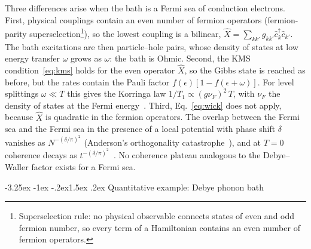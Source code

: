 \documentclass[10pt,a4paper]{article}
\makeatletter
\renewcommand{\subsection}{\@startsection{subsection}{2}{\z@}%
  {-3.25ex \@plus -1ex \@minus -.2ex}{1.5ex \@plus .2ex}%
  {\normalfont\fontsize{15.5pt}{19pt}\selectfont\bfseries}}
\makeatother
\begin{document}
Three differences arise when the bath is a Fermi sea of conduction electrons.
First, physical couplings contain an even number of fermion operators (fermion-parity superselection\footnote{Superselection rule: no physical observable connects states of even and odd fermion number, so every term of a Hamiltonian contains an even number of fermion operators.}), so the lowest coupling is a bilinear, $ \hat X = \sum_{kk'} g_{kk'} \hat c_k^\dagger \hat c_{k'} $. The bath excitations are then particle--hole pairs, whose density of states at low energy transfer $ \omega $ grows as $ \omega $: the bath is Ohmic.
Second, the KMS condition~\eqref{eq:kms} holds for the even operator $ \hat X $, so the Gibbs state is reached as before, but the rates contain the Pauli factor $ f(\epsilon)[1 - f(\epsilon + \omega)] $. For level splittings $ \omega \ll T $ this gives the Korringa law $ 1/T_1 \propto (g \nu_F)^2 \, T $, with $ \nu_F $ the density of states at the Fermi energy~\cite{Korringa1950}.
Third, Eq.~\eqref{eq:wick} does not apply, because $ \hat X $ is quadratic in the fermion operators. The overlap between the Fermi sea and the Fermi sea in the presence of a local potential with phase shift $ \delta $ vanishes as $ N^{-(\delta/\pi)^2} $ (Anderson's orthogonality catastrophe~\cite{Anderson1967}), and at $ T = 0 $ coherence decays as $ t^{-(\delta/\pi)^2} $~\cite{Nozieres1969}. No coherence plateau analogous to the Debye--Waller factor exists for a Fermi sea.

\subsection{Quantitative example: Debye phonon bath}
\label{sec:debye}
\end{document}
